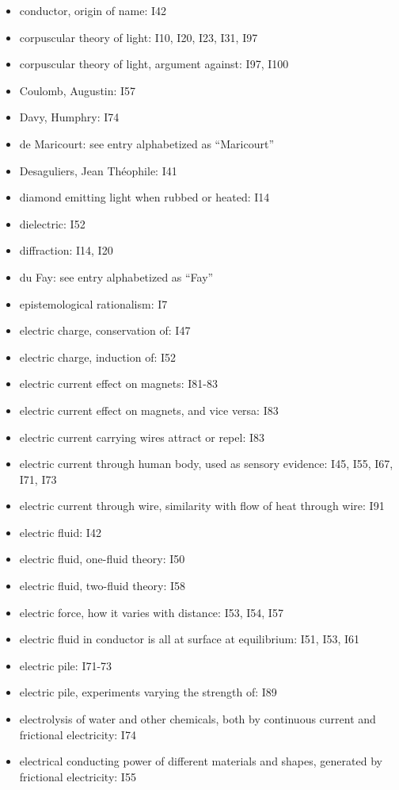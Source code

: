 \documentclass[a4paper]{article}
\theoremstyle{plain}
\theoremstyle{definition}
\begin{document}
\begin{itemize}
\item conductor, origin of name: I42
\item corpuscular theory of light: I10, I20, I23, I31, I97
\item corpuscular theory of light, argument against: I97, I100
\item Coulomb, Augustin: I57
\item Davy, Humphry: I74
\item de Maricourt: see entry alphabetized as ``Maricourt''
\item Desaguliers, Jean Th\'{e}ophile: I41
\item diamond emitting light when rubbed or heated: I14
\item dielectric: I52
\item diffraction: I14, I20
\item du Fay: see entry alphabetized as ``Fay''
\item epistemological rationalism: I7
\item electric charge, conservation of: I47
\item electric charge, induction of: I52
\item electric current effect on magnets: I81-83
\item electric current effect on magnets, and vice versa: I83
\item electric current carrying wires attract or repel: I83
\item electric current through human body, used as sensory evidence: I45, I55, I67, I71, I73
\item electric current through wire, similarity with flow of heat through wire: I91
\item electric fluid: I42
\item electric fluid, one-fluid theory: I50
\item electric fluid, two-fluid theory: I58
\item electric force, how it varies with distance: I53, I54, I57
\item electric fluid in conductor is all at surface at equilibrium: I51, I53, I61
\item electric pile: I71-73
\item electric pile, experiments varying the strength of: I89
\item electrolysis of water and other chemicals, both by continuous current and frictional electricity: I74
\item electrical conducting power of different materials and shapes, generated by frictional electricity: I55

\end{itemize}
\end{document}
